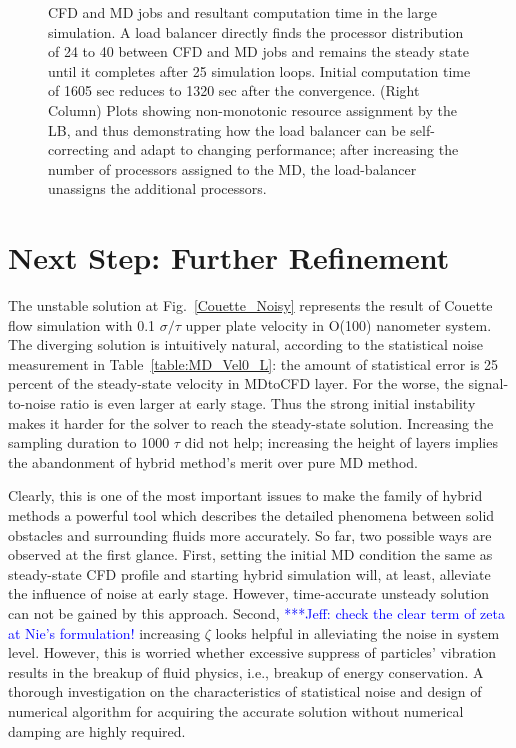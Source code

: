 \documentclass[preprint,12pt]{elsarticle}
\newcommand{\skonote}[1]{ {\textcolor{blue} { ***Jeff: #1 }}}
\newcommand{\skonote}[1]{}
\begin{document}
\begin{figure}
{  CFD and MD jobs and resultant computation time in the large
  simulation. A load balancer directly finds the processor
  distribution of 24 to 40 between CFD and MD jobs and remains the
  steady state until it completes after 25 simulation loops. Initial
  computation time of 1605 sec reduces to 1320 sec after the
  convergence. (Right Column) Plots showing non-monotonic resource
  assignment by the LB, and thus demonstrating how the load balancer
  can be self-correcting and adapt to changing performance; after
  increasing the number of processors assigned to the MD, the
  load-balancer unassigns the additional processors.}
\label{Fig:LBLarge}
\vspace{-1em}
\end{figure}



\section{Next Step: Further Refinement}

The unstable solution at Fig.~\ref{Couette_Noisy} represents the result of Couette flow simulation with 0.1 $\sigma / \tau$ upper plate velocity in O(100) nanometer system. The diverging solution is intuitively natural, according to the statistical noise measurement in Table~\ref{table:MD_Vel0_L}: the amount of statistical error is 25 percent of the steady-state velocity in MDtoCFD layer. For the worse, the signal-to-noise ratio is even larger at early stage. Thus the strong initial instability makes it harder for the solver to reach the steady-state solution. Increasing the sampling duration to 1000 $\tau$ did not help; increasing the height of layers implies the abandonment of hybrid method's merit over pure MD method.


Clearly, this is one of the most important issues to make the family of hybrid methods a powerful tool which describes the detailed phenomena between solid obstacles and surrounding fluids more accurately. So far, two possible ways are observed at the first glance. First, setting the initial MD condition the same as steady-state CFD profile and starting hybrid simulation will, at least, alleviate the influence of noise at early stage. However, time-accurate unsteady solution can not be gained by this approach. Second, \skonote{check the clear term of zeta at Nie's formulation!} increasing $\zeta$ looks helpful in alleviating the noise in system level. However, this is worried whether excessive suppress of particles' vibration results in the breakup of fluid physics, i.e., breakup of energy conservation. A thorough investigation on the characteristics of statistical noise and design of numerical algorithm for acquiring the accurate solution without numerical damping are highly required.
\end{document}
